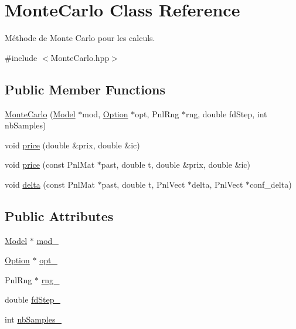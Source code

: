 \hypertarget{classMonteCarlo}{\section{Monte\-Carlo Class Reference}
\label{classMonteCarlo}
}


Méthode de Monte Carlo pour les calculs.  




{\ttfamily \#include $<$Monte\-Carlo.\-hpp$>$}

\subsection*{Public Member Functions}
\begin{DoxyCompactItemize}
\item 
\hyperlink{classMonteCarlo_acae7641859239034c80f7bab79d103f6}{Monte\-Carlo} (\hyperlink{classModel}{Model} $\ast$mod, \hyperlink{classOption}{Option} $\ast$opt, Pnl\-Rng $\ast$rng, double fd\-Step, int nb\-Samples)
\item 
void \hyperlink{classMonteCarlo_a5979d4378e3f28878152a310d8a1f7bf}{price} (double \&prix, double \&ic)
\item 
void \hyperlink{classMonteCarlo_aa7bfce4384323c697d0b06840ad3140f}{price} (const Pnl\-Mat $\ast$past, double t, double \&prix, double \&ic)
\item 
void \hyperlink{classMonteCarlo_a6f495c9330ab7ce8f54e1b6ccb516115}{delta} (const Pnl\-Mat $\ast$past, double t, Pnl\-Vect $\ast$delta, Pnl\-Vect $\ast$conf\-\_\-delta)
\end{DoxyCompactItemize}
\subsection*{Public Attributes}
\begin{DoxyCompactItemize}
\item 
\hyperlink{classModel}{Model} $\ast$ \hyperlink{classMonteCarlo_a1f5378054a887239a93457cf5e33a387}{mod\-\_\-}
\item 
\hyperlink{classOption}{Option} $\ast$ \hyperlink{classMonteCarlo_af0ee580b0eb87f57c7a41cd2a9e6fc6a}{opt\-\_\-}
\item 
Pnl\-Rng $\ast$ \hyperlink{classMonteCarlo_aa41318b565311457e04383047d68936e}{rng\-\_\-}
\item 
double \hyperlink{classMonteCarlo_a87640dad0fffa3c38d70c8be6c8d61cb}{fd\-Step\-\_\-}
\item 
int \hyperlink{classMonteCarlo_a82f5bfded3f8b62f22afaa50f7e73ffe}{nb\-Samples\-\_\-}
\end{DoxyCompactItemize}


